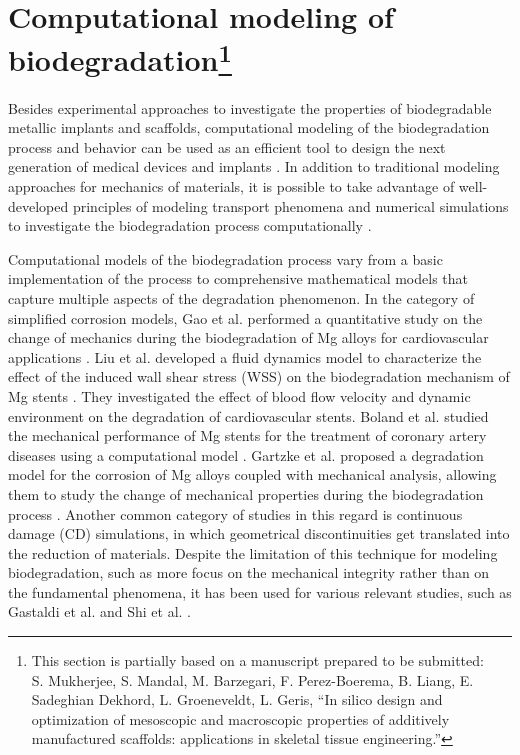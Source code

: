 \section[Computational modeling of biodegradation]{Computational modeling of biodegradation\footnote{This section is partially based on a manuscript prepared to be submitted:\\S. Mukherjee, S. Mandal, M. Barzegari, F. Perez-Boerema, B. Liang, E. Sadeghian Dekhord, L. Groeneveldt, L. Geris, ``In silico design and optimization of mesoscopic and macroscopic properties of additively manufactured scaffolds: applications in skeletal tissue engineering.''}}


Besides experimental approaches to investigate the properties of biodegradable metallic implants and scaffolds, computational modeling of the biodegradation process and behavior can be used as an efficient tool to design the next generation of medical devices and implants \cite{Boland2015}. In addition to traditional modeling approaches for mechanics of materials, it is possible to take advantage of well-developed principles of modeling transport phenomena and numerical simulations to investigate the biodegradation process computationally \cite{SanzHerrera2019}.


Computational models of the biodegradation process vary from a basic implementation of the process to comprehensive mathematical models that capture multiple aspects of the degradation phenomenon. In the category of simplified corrosion models, Gao et al. performed a quantitative study on the change of mechanics during the biodegradation of Mg alloys for cardiovascular applications \cite{Gao2018}. Liu et al. developed a fluid dynamics model to characterize the effect of the induced wall shear stress (\gls{WSS}) on the biodegradation mechanism of Mg stents \cite{Liu2018}. They investigated the effect of blood flow velocity and dynamic environment on the degradation of cardiovascular stents. Boland et al. studied the mechanical performance of Mg stents for the treatment of coronary artery diseases using a computational model \cite{Boland2019}. Gartzke et al. proposed a degradation model for the corrosion of Mg alloys coupled with mechanical analysis, allowing them to study the change of mechanical properties during the biodegradation process \cite{Gartzke2020}. Another common category of studies in this regard is continuous damage (\gls{CD}) simulations, in which geometrical discontinuities get translated into the reduction of materials. Despite the limitation of this technique for modeling biodegradation, such as more focus on the mechanical integrity rather than on the fundamental phenomena, it has been used for various relevant studies, such as Gastaldi et al. \cite{Gastaldi2011} and Shi et al. \cite{Shi2021}.

